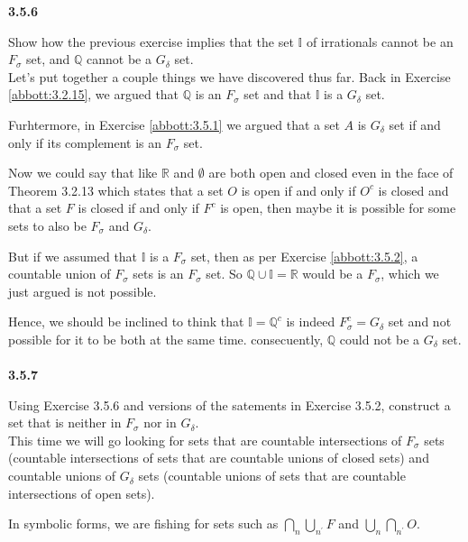 \textbf{3.5.6}

Show how the previous exercise implies that the set $\mathbb{I}$ of irrationals
cannot be an $F_\sigma$ set, and $\mathbb{Q}$ cannot be a $G_\delta$ set.
\\

Let's put together a couple things we have discovered thus far.
Back in Exercise \ref{abbott:3.2.15}, we argued that $\mathbb{Q}$ is an $F_\sigma$ set
and that $\mathbb{I}$ is a $G_\delta$ set.

Furhtermore, in Exercise \ref{abbott:3.5.1} we argued that
a set $A$ is $G_\delta$ set if and only if its complement is an $F_\sigma$ set.

Now we could say that like $\mathbb{R}$ and $\emptyset$ are both open and closed
even in the face of Theorem 3.2.13 which states that
a set $O$ is open if and only if $O^c$ is closed and that
a set $F$ is closed if and only if $F^c$ is open,
then maybe it is possible for some sets to also be $F_\sigma$ and $G_\delta$.

But if we assumed that $\mathbb{I}$ is a $F_\sigma$ set, then as per Exercise \ref{abbott:3.5.2},
a countable union of $F_\sigma$ sets is an $F_\sigma$ set.
So $\mathbb{Q} \cup \mathbb{I} = \mathbb{R}$ would be a $F_\sigma$, which we just argued is not possible.

Hence, we should be inclined to think that $\mathbb{I} = \mathbb{Q}^c$ is indeed $F_{\sigma}^{c} = G_\delta$ set and not possible for it to be
both at the same time.
consecuently, $\mathbb{Q}$ could not be a $G_\delta$ set.
\\~\\


\textbf{3.5.7}

Using Exercise 3.5.6 and versions of the satements in Exercise 3.5.2,
construct a set that is neither in $F_\sigma$ nor in $G_\delta$.
\\

This time we will go looking for sets that are countable intersections of $F_\sigma$ sets
(countable intersections of sets that are countable unions of closed sets)
and countable unions of $G_\delta$ sets
(countable unions of sets that are countable intersections of open sets).

In symbolic forms, we are fishing for sets such as $\bigcap_{n} \bigcup_{n^\prime} F$
and $\bigcup_n \bigcap_{n^\prime} O$.